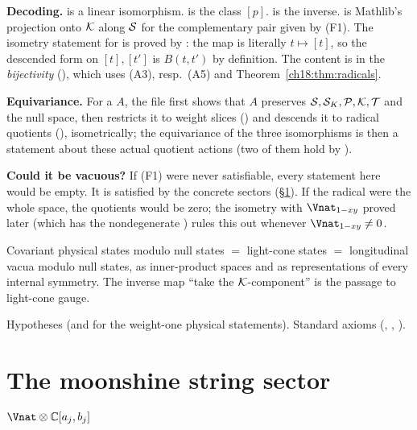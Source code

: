 \begin{dictionary}
\textbf{Decoding.}   is a linear isomorphism.   is the class
$[p]$.   is the inverse.   is Mathlib's
projection onto $\mathcal{K}$ along $\mathcal{S}$ for the complementary pair given by (F1).  The isometry statement for
 is proved by : the map is literally $t\mapsto[t]$, so the
descended form on $[t],[t']$ is $B(t,t')$ by definition.  The content is in the \emph{bijectivity}
(), which uses (A3), resp.\ (A5) and Theorem~\ref{ch18:thm:radicals}.

\textbf{Equivariance.}  For a  $A$, the file  first shows that
$A$ preserves $\mathcal{S},\mathcal{S}_K,\mathcal{P},\mathcal{K},\mathcal{T}$ and the null space, then restricts it to weight slices
() and descends it to radical quotients (),
isometrically; the equivariance of the three isomorphisms is then a statement about these actual
quotient actions (two of them hold by ).

\textbf{Could it be vacuous?}  If (F1) were never satisfiable, every statement here would be empty.  It
is satisfied by the concrete sectors (\S\ref{ch18:sec:sector}).  If the radical were the whole space, the
quotients would be zero; the isometry with $\Vnat_{1-xy}$ proved later (which has the nondegenerate
) rules this out whenever $\Vnat_{1-xy}\neq0$.
\end{dictionary}
\begin{physics}
Covariant physical states modulo null states $=$ light-cone states $=$ longitudinal vacua modulo null
states, as inner-product spaces and as representations of every internal symmetry.  The inverse map
``take the $\mathcal{K}$-component'' is the passage to light-cone gauge.
\end{physics}
\begin{status}
Hypotheses  (and  for the weight-one physical statements).  Standard axioms
(, ,
).
\end{status}

\section{The moonshine string sector \texorpdfstring{$\Vnat\otimes\mathbb C[a_j,b_j]$}{V-natural tensor C[a,b]}}\label{ch18:sec:sector}

